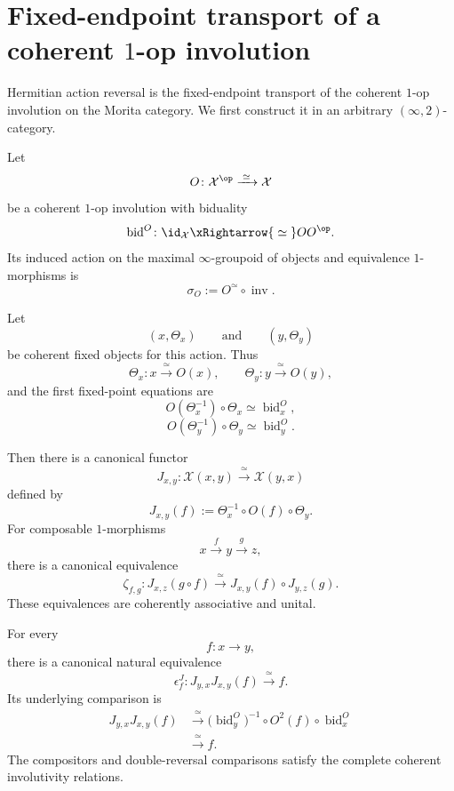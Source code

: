 \section{Fixed-endpoint transport of a coherent $1$-op involution}
\label{sec:fixed-endpoint-transport-one-op}

Hermitian action reversal is the fixed-endpoint transport of the
coherent $1$-op involution on the Morita category. We first construct it
in an arbitrary $(\infty,2)$-category.

\begin{proposition}
\label{prop:fixed-endpoint-transport-one-op}
Let
\[
    O
    \colon
    \mathcal X^{\op}
    \xrightarrow{\;\simeq\;}
    \mathcal X
\]
be a coherent $1$-op involution with biduality
\[
    \operatorname{bid}^{O}
    \colon
    \id_{\mathcal X}
    \xRightarrow{\;\simeq\;}
    OO^{\op}.
\]
Its induced action on the maximal $\infty$-groupoid of objects and
equivalence $1$-morphisms is
\[
    \sigma_O
    :=
    O^\simeq\circ\operatorname{inv}.
\]

Let
\[
    (x,\Theta_x)
    \qquad\text{and}\qquad
    (y,\Theta_y)
\]
be coherent fixed objects for this action. Thus
\[
    \Theta_x
    \colon
    x
    \xrightarrow{\;\simeq\;}
    O(x),
    \qquad
    \Theta_y
    \colon
    y
    \xrightarrow{\;\simeq\;}
    O(y),
\]
and the first fixed-point equations are
\[
    O(\Theta_x^{-1})\circ\Theta_x
    \simeq
    \operatorname{bid}^{O}_x,
\]
\[
    O(\Theta_y^{-1})\circ\Theta_y
    \simeq
    \operatorname{bid}^{O}_y.
\]

Then there is a canonical functor
\[
    J_{x,y}
    \colon
    \mathcal X(x,y)
    \xrightarrow{\;\simeq\;}
    \mathcal X(y,x)
\]
defined by
\[
    J_{x,y}(f)
    :=
    \Theta_x^{-1}
    \circ
    O(f)
    \circ
    \Theta_y.
\]
For composable $1$-morphisms
\[
    x
    \xrightarrow{f}
    y
    \xrightarrow{g}
    z,
\]
there is a canonical equivalence
\[
    \zeta_{f,g}
    \colon
    J_{x,z}(g\circ f)
    \xrightarrow{\;\simeq\;}
    J_{x,y}(f)
    \circ
    J_{y,z}(g).
\]
These equivalences are coherently associative and unital.

For every
\[
    f
    \colon
    x
    \longrightarrow
    y,
\]
there is a canonical natural equivalence
\[
    \epsilon^J_f
    \colon
    J_{y,x}J_{x,y}(f)
    \xrightarrow{\;\simeq\;}
    f.
\]
Its underlying comparison is
\[
\begin{aligned}
    J_{y,x}J_{x,y}(f)
    &\xrightarrow{\;\simeq\;}
    \bigl(
        \operatorname{bid}^{O}_y
    \bigr)^{-1}
    \circ
    O^2(f)
    \circ
    \operatorname{bid}^{O}_x
    \\
    &\xrightarrow{\;\simeq\;}
    f.
\end{aligned}
\]
The compositors and double-reversal comparisons satisfy the complete
coherent involutivity relations.
\end{proposition}

